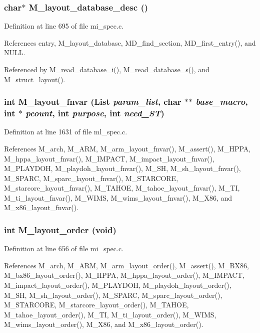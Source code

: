 \subsubsection{\setlength{\rightskip}{0pt plus 5cm}char$\ast$ M\_\-layout\_\-database\_\-desc ()}\label{m__spec_8h_d5392e7745470e33a59bf2e53d4929a9}




Definition at line 695 of file mi\_\-spec.c.

References entry, M\_\-layout\_\-database, MD\_\-find\_\-section, MD\_\-first\_\-entry(), and NULL.

Referenced by M\_\-read\_\-database\_\-i(), M\_\-read\_\-database\_\-s(), and M\_\-struct\_\-layout().
\subsubsection{\setlength{\rightskip}{0pt plus 5cm}int M\_\-layout\_\-fnvar (\bf{List} {\em param\_\-list}, char $\ast$$\ast$ {\em base\_\-macro}, int $\ast$ {\em pcount}, int {\em purpose}, int {\em need\_\-ST})}\label{m__spec_8h_3650510f7f52799bac1c9f81e1b78d02}




Definition at line 1631 of file ml\_\-spec.c.

References M\_\-arch, M\_\-ARM, M\_\-arm\_\-layout\_\-fnvar(), M\_\-assert(), M\_\-HPPA, M\_\-hppa\_\-layout\_\-fnvar(), M\_\-IMPACT, M\_\-impact\_\-layout\_\-fnvar(), M\_\-PLAYDOH, M\_\-playdoh\_\-layout\_\-fnvar(), M\_\-SH, M\_\-sh\_\-layout\_\-fnvar(), M\_\-SPARC, M\_\-sparc\_\-layout\_\-fnvar(), M\_\-STARCORE, M\_\-starcore\_\-layout\_\-fnvar(), M\_\-TAHOE, M\_\-tahoe\_\-layout\_\-fnvar(), M\_\-TI, M\_\-ti\_\-layout\_\-fnvar(), M\_\-WIMS, M\_\-wims\_\-layout\_\-fnvar(), M\_\-X86, and M\_\-x86\_\-layout\_\-fnvar().
\subsubsection{\setlength{\rightskip}{0pt plus 5cm}int M\_\-layout\_\-order (void)}\label{m__spec_8h_99d98f0711d522e17f0f04ab2eafb5be}




Definition at line 656 of file mi\_\-spec.c.

References M\_\-arch, M\_\-ARM, M\_\-arm\_\-layout\_\-order(), M\_\-assert(), M\_\-BX86, M\_\-bx86\_\-layout\_\-order(), M\_\-HPPA, M\_\-hppa\_\-layout\_\-order(), M\_\-IMPACT, M\_\-impact\_\-layout\_\-order(), M\_\-PLAYDOH, M\_\-playdoh\_\-layout\_\-order(), M\_\-SH, M\_\-sh\_\-layout\_\-order(), M\_\-SPARC, M\_\-sparc\_\-layout\_\-order(), M\_\-STARCORE, M\_\-starcore\_\-layout\_\-order(), M\_\-TAHOE, M\_\-tahoe\_\-layout\_\-order(), M\_\-TI, M\_\-ti\_\-layout\_\-order(), M\_\-WIMS, M\_\-wims\_\-layout\_\-order(), M\_\-X86, and M\_\-x86\_\-layout\_\-order().
